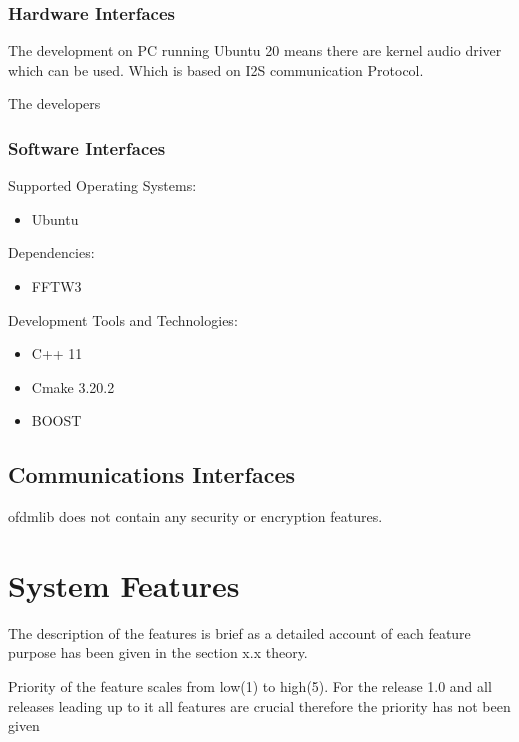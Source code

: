 \documentclass[]{report}
\begin{document}
\subsubsection{Hardware Interfaces}

The development on PC running Ubuntu 20 means there are kernel audio driver which can be used. Which is based on I2S communication Protocol.

The developers 

\subsubsection{Software Interfaces}


Supported Operating Systems:

\begin{itemize}
	\item Ubuntu
\end{itemize}

Dependencies:

\begin{itemize}
	\item FFTW3
\end{itemize}\textbf{}

Development Tools and Technologies:
\begin{itemize}
	\item C++ 11
	\item Cmake 3.20.2
	\item BOOST
\end{itemize}\textbf{}


\subsection{Communications Interfaces}

ofdmlib does not contain any security or encryption features.

\setlength{\parindent}{0em}
\setlength{\parskip}{1em}

\pagebreak
\section{System Features}

The description of the features is brief as a detailed account of each feature purpose has been given in the section x.x theory.

Priority of the feature scales from low(1) to high(5).
For the release 1.0 and all releases leading up to it all features are crucial therefore the priority has not been given
\end{document}
